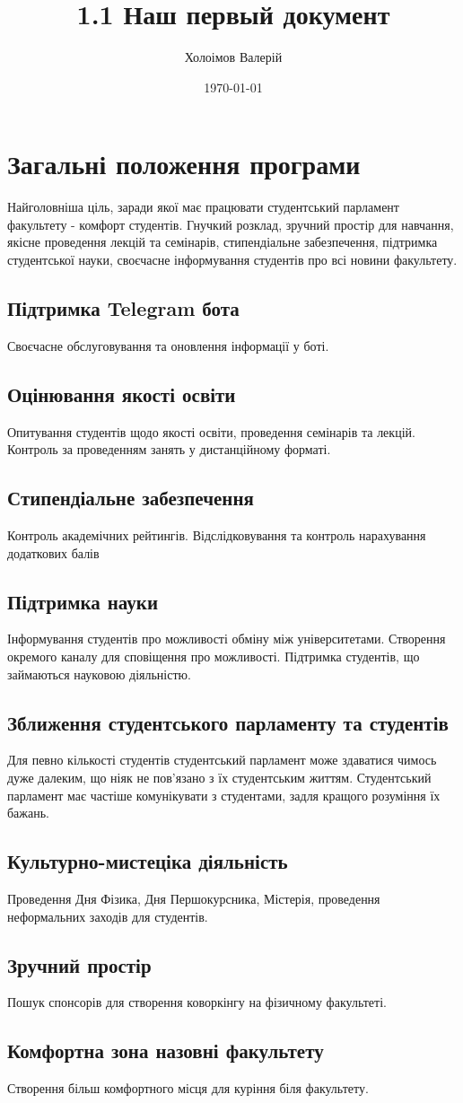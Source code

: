 \documentclass[a4paper,12pt]{article}
\author{Холоімов Валерій}
\title{1.1 Наш первый документ}
\date{\today}
\begin{document}
\section{Загальні положення програми}
\qquad Найголовніша ціль, заради якої має працювати студентський парламент факультету - комфорт студентів. Гнучкий розклад, зручний простір для навчання, якісне проведення лекцій та семінарів, стипендіальне забезпечення, підтримка студентської науки, своєчасне інформування студентів про всі новини факультету.
\subsection{Підтримка Telegram бота}
Своєчасне обслуговування та  оновлення інформації у боті.
\subsection{Оцінювання якості освіти}
Опитування студентів щодо якості освіти, проведення семінарів та лекцій. Контроль за проведенням занять у дистанційному форматі.
\subsection{Стипендіальне забезпечення}
Контроль академічних рейтингів. Відслідковування та контроль нарахування додаткових балів
\subsection{Підтримка науки}
Інформування студентів про можливості обміну між університетами. Створення окремого каналу для сповіщення про можливості. Підтримка студентів, що займаються науковою діяльністю.
\subsection{Зближення студентського парламенту та студентів}
Для певно кількості студентів студентський парламент може здаватися чимось дуже далеким, що ніяк не пов'язано з їх студентським життям. Студентський парламент має частіше комунікувати з студентами, задля кращого розуміння їх бажань.
\subsection{Культурно-мистеціка діяльність}
Проведення Дня Фізика, Дня Першокурсника, Містерія, проведення неформальних заходів для студентів.
\subsection{Зручний простір}
Пошук спонсорів для створення коворкінгу на фізичному факультеті.
\subsection{Комфортна зона назовні факультету}
Створення більш комфортного місця для куріння біля факультету.
\end{document}
